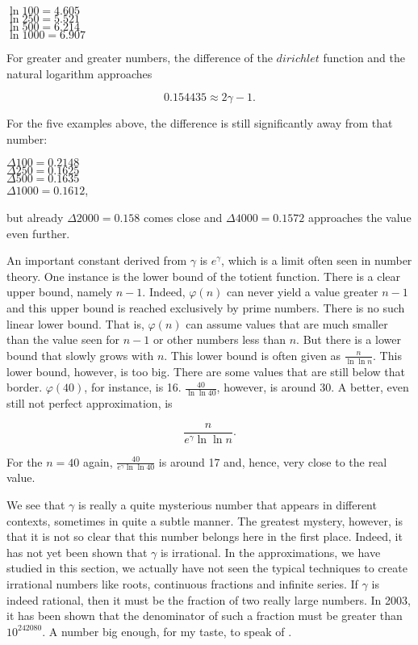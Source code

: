 \documentclass[tikz]{scrreprt}
\newcommand{\Varid}[1]{\mathit{#1}}
\begin{document}
$\ln 100  = 4.605$\\
$\ln 250  = 5.521$\\
$\ln 500  = 6.214$\\
$\ln 1000  = 6.907$

For greater and greater numbers,
the difference of 
the \ensuremath{\Varid{dirichlet}} function and 
the natural logarithm approaches

\begin{equation}
0.154435 \approx 2\gamma - 1.
\end{equation}

For the five examples above, the difference
is still significantly away from that number:

$\Delta 100 = 0.2148$\\
$\Delta 250 = 0.1625$\\
$\Delta 500 = 0.1635$\\
$\Delta 1000= 0.1612$,

but already $\Delta 2000 = 0.158$ comes close and
$\Delta 4000 = 0.1572$ 
approaches the value even further.

An important constant derived from $\gamma$ is
$e^{\gamma}$, which is a limit often seen in 
number theory. One instance is the lower bound
of the totient function. There is a clear upper bound,
namely $n-1$. Indeed, $\varphi(n)$ can never 
yield a value greater $n-1$ and this upper bound
is reached exclusively by prime numbers.
There is no such linear lower bound. 
That is, $\varphi(n)$ can assume values that are much smaller
than the value seen for $n-1$ or other numbers less than $n$.
But there is a lower bound that slowly grows with $n$.
This lower bound is often given as $\frac{n}{\ln\ln n}$.
This lower bound, however, is too big.
There are some values that are still below that border.
$\varphi(40)$, for instance, is 16.
$\frac{40}{\ln \ln 40}$, however, is around 30.
A better, even still not perfect approximation, is

\[
\frac{n}{e^{\gamma}\ln \ln n}.
\]

For the $n=40$ again,
$\frac{40}{e^{\gamma}\ln \ln 40}$ is around 17 and, hence,
very close to the real value.

We see that $\gamma$ is really a quite mysterious number
that appears in different contexts, sometimes in quite
a subtle manner.
The greatest mystery, however, is that it is not so clear
that this number belongs here in the first place.
Indeed, it has not yet been shown that $\gamma$ is irrational.
In the approximations, we have studied in this section,
we actually have not seen 
the typical techniques to create irrational numbers 
like roots, continuous fractions and infinite series.
If $\gamma$ is indeed rational, then it must be the fraction
of two really large numbers. In 2003, it has been shown
that the denominator of such a fraction must be greater
than $10^{242080}$. 
A number big enough, for my taste, to speak of .
\end{document}
